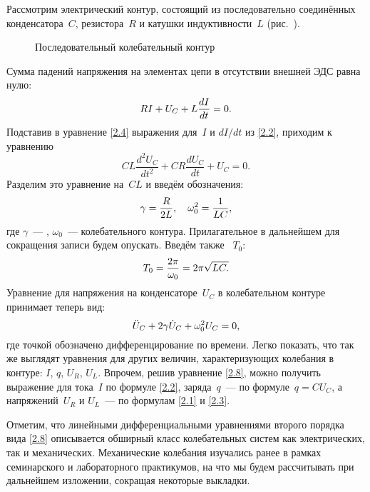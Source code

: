 \label{sec:free}

Рассмотрим электрический контур, состоящий из последовательно соединённых
конденсатора~$C$, резистора~$R$  и катушки индуктивности~$L$
(рис.~).

\begin{figure}[h!]
	\centering
	\caption{Последовательный колебательный контур}
\end{figure}

Сумма падений напряжения на элементах цепи в отсутствии внешней ЭДС равна нулю:
\begin{equation}
	\eqmark{2.4}
	RI+U_C+L\dfrac{dI}{dt}=0.
\end{equation}
Подставив в уравнение \eqref{2.4} выражения для~$I$ и $dI/dt$ из \eqref{2.2},
приходим к уравнению
\begin{equation*}
	CL\dfrac{d^2 U_{C} }{dt^2}+CR\dfrac{dU_C}{dt}+U_C=0.
\end{equation*}
Разделим это уравнение на~$CL$ и введём обозначения:
\begin{equation}\eqmark{2.6}
\gamma=\dfrac{R}{2L},~~~\omega_0^2=\dfrac{1}{LC},
\end{equation}
где $\gamma$~--- ,
$\omega_0$~---  колебательного контура.
Прилагательное   в дальнейшем для сокращения записи будем 
опускать. Введём также  ~$T_0$:
\begin{equation}\eqmark{2.7}
T_0=\dfrac{2\pi}{\omega_0}=2\pi\sqrt{LC.}
\end{equation}
Уравнение для напряжения на конденсаторе~$U_C$ в колебательном контуре 
принимает теперь вид:
\begin{equation}\eqmark{2.8}
\ddot{U}_C+2\gamma\dot{U}_C+\omega_0^2U_C=0,
\end{equation}
где точкой обозначено дифференцирование по времени. Легко показать, что так же
выглядят уравнения для других величин, характеризующих колебания в контуре:
$I$, $q$, $U_R$, $U_L$.
Впрочем, решив уравнение \eqref{2.8}, можно получить выражение для тока~$I$ по
формуле \eqref{2.2}, заряда~$q$~--- по формуле~$q=CU_C$, а напряжений~$U_R$ и
$U_L$~--- по формулам \eqref{2.1} и \eqref{2.3}.

Отметим, что линейными дифференциальными уравнениями второго порядка вида
\eqref{2.8} описывается обширный класс колебательных систем как электрических,
так и механических. Механические колебания изучались ранее в рамках
семинарского и лабораторного практикумов, на что мы будем рассчитывать при
дальнейшем изложении, сокращая некоторые выкладки.

